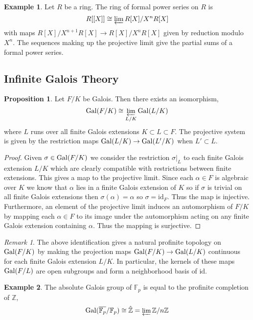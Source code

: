 \documentclass[12pt]{article}
\newcommand{\Z}{\mathbb{Z}}
\newcommand{\finfield}[1]{\mathbb{F}_{#1}}
\newcommand{\Gal}[1]{\mathrm{Gal} \small(#1 \small)}
\newcommand{\id}{\mathrm{id}}
\theoremstyle{remark}
\newtheorem*{remark}{Remark}
\theoremstyle{definition}
\newtheorem{proposition}[theorem]{Proposition}
\newtheorem*{example}{Example}
\begin{document}
\begin{example}
Let $R$ be a ring. The ring of formal power series on $R$ is
\[ R[[X]] \cong \varprojlim R[X] / X^n R[X] \]
with maps $R[X] / X^{n+1} R[X] \to R[X] / X^n R[X]$ given by reduction modulo $X^n$. The sequences making up the projective limit give the partial sums of a formal power series.
\end{example}

\subsection{Infinite Galois Theory}

\begin{proposition}
Let $F / K$ be Galois. Then there exists an isomorphism,
\[ \Gal{F / K} \cong \varprojlim_{L/K} \Gal{L / K} \] 
where $L$ runs over all finite Galois extensions $K \subset L \subset F$. The projective system is given by the restriction maps $\Gal{L / K} \to \Gal{L' / K}$ when $L' \subset L$. 
\end{proposition}

\begin{proof}
Given $\sigma \in \Gal{F / K}$ we consider the restriction $\sigma |_L$ to each finite Galois extension $L / K$ which are clearly compatible with restrictions between finite extensions. This gives a map to the projective limit. Since each $\alpha \in F$ is algebraic over $K$ we know that $\alpha$ lies in a finite Galois extension of $K$ so if $\sigma$ is trivial on all finite Galois extensions then $\sigma(\alpha) = \alpha$ so $\sigma = \id_F$. Thus the map is injective. Furthermore, an element of the projective limit induces an automorphism of $F / K$ by mapping each $\alpha \in F$ to its image under the automorphism acting on any finite Galois extension containing $\alpha$. Thus the mapping is surjective. 
\end{proof}

\begin{remark}
The above identification gives a natural profinite topology on $\Gal{F/ K}$ by making the projection maps $\Gal{F / K} \to \Gal{L / K}$ continuous for each finite Galois extension $L / K$. In particular, the kernels of these maps $\Gal{F / L}$ are open subgroups and form a neighborhood basis of $\id$. 
\end{remark}

\begin{example}
The absolute Galois group of $\finfield{p}$ is equal to the profinite completion of $\Z$, 
\[ \Gal{\overline{\finfield{p}} / \finfield{p}} \cong \hat{\Z} = \varprojlim \Z / n \Z \]
\end{example}
\end{document}
